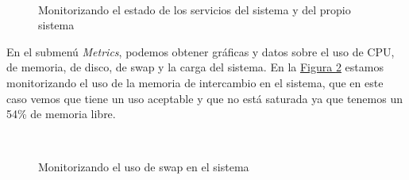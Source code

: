 \documentclass[10pt,a4paper,spanish]{article}
\numberwithin{equation}{section} %
\numberwithin{figure}{section} %
\numberwithin{table}{section} %
\begin{document}
\begin{figure}[!h]
\centering
\mbox {
\qquad
{}
}
\caption{Monitorizando el estado de los servicios del sistema y del propio sistema}
\label{monit}
\end{figure}

En el submenú \textit{Metrics}, podemos obtener gráficas y datos sobre el uso de CPU, de memoria, de disco, de swap y la carga del sistema. En la \hyperref[swapuse]{Figura \ref*{swapuse}} estamos monitorizando el uso de la memoria de intercambio en el sistema, que en este caso vemos que tiene un uso aceptable y que no está saturada ya que tenemos un 54\% de memoria libre.

\begin{figure}[!h]
\centering
\mbox {
\qquad
{}
}
\caption{Monitorizando el uso de swap en el sistema}
\label{swapuse}
\end{figure}
\end{document}
